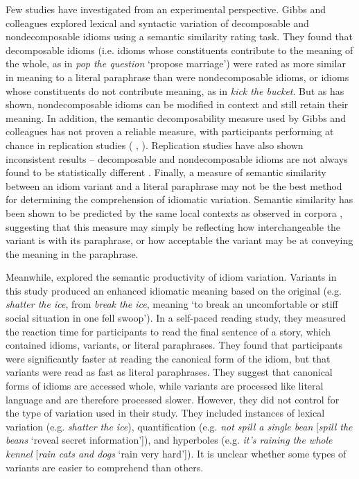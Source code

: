 \documentclass[output=paper
,modfonts
,nonflat]{langsci/langscibook}
\begin{document}
Few studies have investigated  from an experimental perspective. Gibbs and colleagues \citep{GibbsEtAl1989, GibbsNayak1989} explored lexical and syntactic variation of decomposable and nondecomposable idioms using a semantic similarity rating task. They found that decomposable idioms (i.e. idioms whose constituents contribute to the meaning of the whole, as in \textit{pop the question} `propose marriage') were rated as more similar in meaning to a literal paraphrase than were nondecomposable idioms, or idioms whose constituents do not contribute meaning, as in \textit{kick the bucket}. But as \citet{Duffley2013} has shown, nondecomposable idioms can be modified in context and still retain their meaning. In addition, the semantic decomposability measure used by Gibbs and colleagues has not proven a reliable measure, with participants performing at chance in replication studies (\citeauthor{TitoneConnine1994} \citeyear*{TitoneConnine1994}, \citeauthor*{TabossiEtAl2008} \citeyear*{TabossiEtAl2008}). Replication studies have also shown inconsistent results -- decomposable and nondecomposable idioms are not always found to be statistically different \citep{TabossiEtAl2008}. Finally, a measure of semantic similarity between an idiom variant and a literal paraphrase may not be the best method for determining the comprehension of idiomatic variation. Semantic similarity has been shown to be predicted by the same local contexts as observed in corpora \citep{MillerCharles1991}, suggesting that this measure may simply be reflecting how interchangeable the variant is with its paraphrase, or how acceptable the variant may be at conveying the meaning in the paraphrase.

Meanwhile, \citet{McGloneEtAl1994} explored the semantic productivity of idiom variation. Variants in this study produced an enhanced idiomatic meaning based on the original (e.g. \textit{shatter the ice}, from \textit{break the ice}, meaning `to break an uncomfortable or stiff social situation in one fell swoop'). In a self-paced reading study, they measured the reaction time for participants to read the final sentence of a story, which contained idioms, variants, or literal paraphrases. They found that participants were significantly faster at reading the canonical form of the idiom, but that variants were read as fast as literal paraphrases. They suggest that canonical forms of idioms are accessed whole, while variants are processed like literal language and are therefore processed slower. However, they did not control for the type of variation used in their study. They included instances of lexical variation (e.g. \textit{shatter the ice}), quantification (e.g. \textit{not spill a single bean} [\textit{spill the beans} `reveal secret information']), and hyperboles (e.g. \textit{it's raining the whole kennel} [\textit{rain cats and dogs} `rain very hard']). It is unclear whether some types of variants are easier to comprehend than others. 
\end{document}
